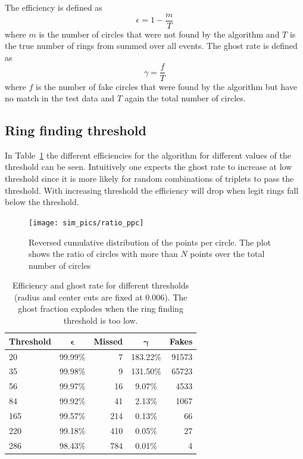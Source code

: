 \documentclass[11pt]{scrreprt}
\begin{document}
The efficiency is defined as 
\begin{equation}
\epsilon = 1 - \frac{m}{T}    
\end{equation}
where $m$ is the number of circles that were not found by the algorithm and $T$ is the true number of rings from summed over all events. The ghost rate is defined as 
\begin{equation}
  \gamma = \frac{f}{T} 
\end{equation}
where $f$ is the number of fake circles that were found by the algorithm but have no match in the test data and $T$ again the
total number of circles.


\subsection{Ring finding threshold} %
\label{sub:different_thresholds2}

In Table~\ref{tab:threshold_cuts} the different efficiencies for the algorithm for different values of the threshold can be seen. 
Intuitively one expects the ghost rate to increase at low threshold since it is more likely for random combinations of triplets to pass the threshold. With increasing threshold the efficiency will drop when legit rings fall below the threshold. 

\begin{figure}[tb]
  \centering
  \texttt{[image: sim\_pics/ratio\_ppc]}
  \caption{Reversed cumulative distribution of the points per circle. The plot shows the ratio of circles with more than $N$ points over the
  total number of circles}
  \label{fig:ratio_ppc}
\end{figure}


\begin{table}[tb]
  \caption[Efficiencies for different thresholds]{Efficiency and ghost rate for different thresholds (radius and center cuts are fixed at $0.006$). The ghost fraction explodes when the ring finding threshold is too low.}
  \label{tab:threshold_cuts}
  \centering

  \begin{tabular}{lcrcr}
  \toprule
  \textbf{Threshold} & $\boldsymbol{\epsilon}$ & \textbf{Missed} & $\boldsymbol{\gamma}$ & \textbf{Fakes} \\
  \midrule
  20  & 99.99\% & 7 & 183.22\% & 91573 \\
  35  & 99.98\% & 9 & 131.50\% & 65723 \\
  56  & 99.97\% & 16 & 9.07\% & 4533 \\
  84  & 99.92\% & 41 & 2.13\% & 1067 \\
  165 & 99.57\% & 214 & 0.13\% & 66 \\
  220 & 99.18\% & 410 & 0.05\% & 27 \\
  286 & 98.43\% & 784 & 0.01\% & 4 \\
  \bottomrule
  \end{tabular}
\end{table}
\end{document}
